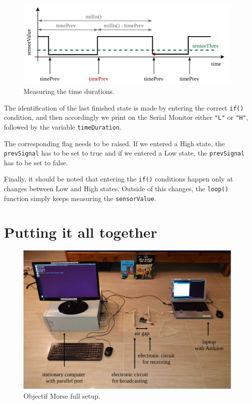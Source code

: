 \documentclass[12pt]{report}
\begin{document}
\begin{figure}[H]
\centering\includegraphics[scale=0.18]{timedurations}
\caption{Measuring the time durations.}				
\label{fig:timedur}
\end{figure}

The identification of the last finished state is made by entering the correct \verb|if()| condition, and then accordingly we print on the Serial Monitor either \verb|"L"| or \verb|"H"|, followed by the variable \verb|timeDuration|.

The corresponding flag needs to be raised. If we entered a High state, the \verb|prevSignal| has to be set to true and if we entered a Low state, the \verb|prevSignal| has to be set to false.

Finally, it should be noted that entering the \verb|if()| conditions happen only at changes between Low and High states. Outside of this changes, the \verb|loop()| function simply keeps measuring the \verb|sensorValue|.




\chapter{Putting it all together}


\begin{figure}[H]
\centering\includegraphics[width=15cm]{full_setup}
\caption{Objectif Morse full setup.}				
\label{fig:full_setup}
\end{figure}
\end{document}
